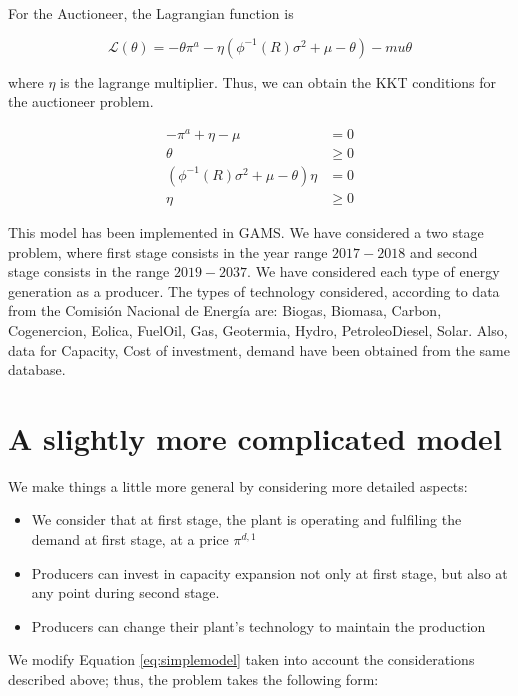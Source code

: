 \documentclass[11pt, letterpaper]{article}
\begin{document}
For the Auctioneer, the Lagrangian function is 

\begin{equation}
    \mathcal{L}(\theta)= -\theta \pi^{a} - \eta (\phi^{-1}(R) \sigma^2 + \mu - \theta) - mu\theta
\end{equation}

where $\eta$ is the lagrange multiplier. Thus, we can obtain the KKT conditions for the auctioneer problem.

\begin{align}
    -\pi^{a} +\eta -\mu & = 0 \\
    \theta & \geq  0 \\
    (\phi^{-1}(R) \sigma^2 + \mu - \theta) \eta & =  0\\
    \eta & \geq  0
\end{align}

This model has been implemented in GAMS. We have considered a two stage problem, where first stage consists in the year range $2017-2018$ and second stage consists in the range $2019-2037$. We have considered each type of energy generation as a producer. The types of technology considered, according to data from the Comisi\'on Nacional de Energ\'ia are: Biogas, Biomasa, Carbon, Cogenercion, Eolica, FuelOil, Gas, Geotermia, Hydro, PetroleoDiesel, Solar. Also, data for Capacity, Cost of investment, demand have been obtained from the same database. 


\section{A slightly more complicated model}

We make things a little more general by considering more detailed aspects:

\begin{itemize}
    \item We consider that at first stage, the plant is operating and fulfiling the demand at first stage, at a price $\pi^{d,1}$
    \item Producers can invest in capacity expansion not only at first stage, but also at any point during second stage. 
    \item Producers can change their plant's technology to maintain the production
\end{itemize}

We modify Equation \ref{eq:simplemodel} taken into account the considerations described above; thus, the problem takes the following form:
\end{document}
